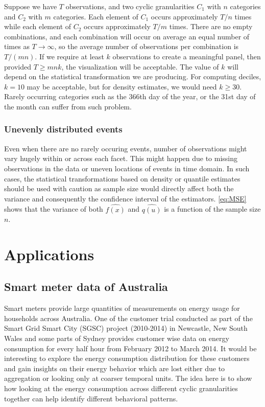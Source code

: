 \documentclass[12pt]{article}
\begin{document}
Suppose we have \(T\) observations, and two cyclic granularities \(C_1\) with \(n\) categories and \(C_2\) with \(m\) categories. Each element of \(C_1\) occurs approximately \(T/n\) times while each element of \(C_2\) occurs approximately \(T/m\) times. There are no empty combinations, and each combination will occur on average an equal number of times as \(T\rightarrow\infty\), so the average number of observations per combination is \(T/(mn)\). If we require at least \(k\) observations to create a meaningful panel, then provided \(T \ge mnk\), the visualization will be acceptable. The value of \(k\) will depend on the statistical transformation we are producing. For computing deciles, \(k=10\) may be acceptable, but for density estimates, we would need \(k \ge 30\). Rarely occurring categories such as the 366th day of the year, or the 31st day of the month can suffer from such problem.

\hypertarget{unevenly-distributed-events}{%
\subsubsection{Unevenly distributed events}\label{unevenly-distributed-events}}

Even when there are no rarely occuring events, number of observations might vary hugely within or across each facet. This might happen due to missing observations in the data or uneven locations of events in time domain. In such cases, the statistical transformations based on density or quantile estimates should be used with caution as sample size would directly affect both the variance and consequently the confidence interval of the estimators. \autoref{eq:MSE} shows that the variance of both \(\hat{f(x)}\) and \(\hat{q(u)}\) is a function of the sample size \(n\).

\hypertarget{sec:application}{%
\section{Applications}\label{sec:application}}

\hypertarget{sec:smartmeter}{%
\subsection{Smart meter data of Australia}\label{sec:smartmeter}}

Smart meters provide large quantities of measurements on energy usage for households across Australia. One of the customer trial \citep{smart-meter} conducted as part of the Smart Grid Smart City (SGSC) project (2010-2014) in Newcastle, New South Wales and some parts of Sydney provides customer wise data on energy consumption for every half hour from February 2012 to March 2014. It would be interesting to explore the energy consumption distribution for these customers and gain insights on their energy behavior which are lost either due to aggregation or looking only at coarser temporal units. The idea here is to show how looking at the energy consumption across different cyclic granularities together can help identify different behavioral patterns.
\end{document}
